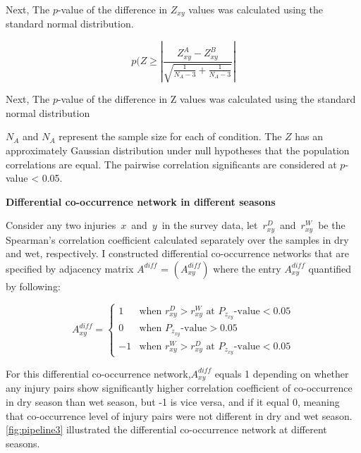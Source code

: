 Next, The $p$-value of the difference in $Z_{xy}$ values was calculated using the standard normal distribution.

\begin{equation}
\label{eq:pofz}
p(Z\geq \left | \frac{Z_{xy}^A - Z_{xy}^B}{\sqrt{\frac{1}{N_{A}-3}+ \frac{1}{N_{A}-3}}} \right |
\end{equation}

Next, The $p$-value of the difference in Z values was calculated using the standard normal distribution

$N_{A}$ and $N_{A}$ represent the sample size for each of condition. The $Z$ has an approximately Gaussian distribution under null hypotheses that the population correlations are equal. The pairwise correlation significants are considered at $p$-value < 0.05.


\textbf{Differential co-occurrence network in different seasons}

Consider any two injuries $x$ and $y$ in the survey data, let $r_{xy}^D$ and $r_{xy}^W$ be the Spearman’s correlation coefficient calculated separately over the samples in dry and wet, respectively. I constructed differential co-occurrence networks that are specified by adjacency matrix $A^{diff}$ = $(A_{xy}^{diff})$ where the entry $A_{xy}^{diff}$ quantified by following:   


\begin{equation}
A_{xy}^{diff} = \left\{\begin{matrix}
 1 & \text{when } r_{xy}^D > r_{xy}^W \text{ at } P_{z_{xy}} \text{-value}  < 0.05  \\ 
 0 & \text{when } P_{z_{xy}}  \text{-value}  > 0.05                              \\ -1 & \text{when } r_{xy}^W > r_{xy}^D \text{ at } P_{z_{xy}} \text{-value}  < 0.05 \end{matrix}\right.\end{equation}


For this differential co-occurrence network,$A_{xy}^{diff}$ equals 1 depending on whether any injury pairs show significantly higher correlation coefficient of co-occurrence  in dry season than wet season, but -1 is vice versa, and if it equal 0, meaning that co-occurrence level of injury pairs were not different in dry and wet season. \ref{fig:pipeline3} illustrated the differential co-occurrence network at different seasons.

